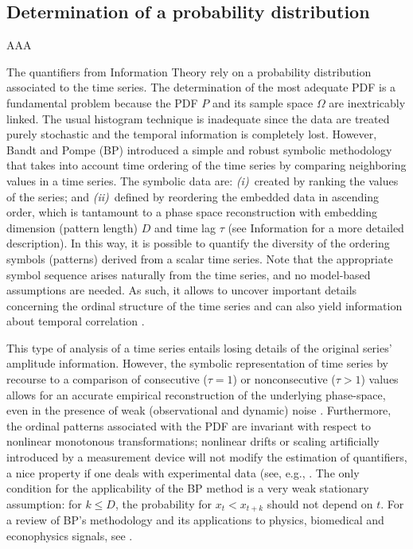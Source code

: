 \subsection{Determination of a probability distribution}

AAA

The quantifiers from Information Theory rely on a probability distribution associated to the time series. 
The determination of the most adequate PDF is a fundamental problem because the PDF $P$ and its sample space 
$\Omega$ are inextricably linked. The usual histogram technique is inadequate since the data are treated purely stochastic and the temporal information is completely lost. 
However, Bandt and Pompe (BP)\cite{Bandt2002} introduced a simple and robust symbolic methodology that takes into account time ordering of the time series by comparing neighboring values in a time series.
The symbolic data are:
{\it (i)\/}~created by ranking the values of the series; and
{\it (ii)\/}~defined by reordering the embedded data in ascending order, which is tantamount to a phase space 
reconstruction with embedding dimension (pattern length) $D$ and time lag $\tau$ (see Information for a more detailed description). 
In this way, it is possible to quantify the diversity of the ordering symbols (patterns) derived from a scalar 
time series.
Note that the appropriate symbol sequence arises naturally from the time series, and no model-based assumptions 
are needed.
As such, it allows to uncover important details concerning the ordinal structure of the time series
\cite{Rosso2007} and can also yield information about temporal correlation \cite{Rosso2009}.

This type of analysis of a time series entails losing details of the original series' amplitude information. However, the symbolic representation of time series by recourse to a comparison of consecutive ($\tau = 1$) or nonconsecutive ($\tau > 1$) values allows for an accurate empirical reconstruction of the underlying phase-space, even in the presence of weak (observational and dynamic) noise \cite{Bandt2002}. Furthermore, the ordinal patterns associated with the PDF are invariant with respect to nonlinear monotonous transformations; nonlinear drifts or scaling artificially introduced by a measurement device will not modify the estimation of quantifiers, a nice property if one deals with experimental data (see, e.g., \cite{Saco2010}. 
The only condition for the applicability of the BP method is a very weak stationary assumption: for 
$k \leq D$, the probability for $x_t < x_{t+k}$ should not depend on $t$.
For a review of BP's methodology and its applications to physics, biomedical and econophysics signals, see \cite{Zanin2012}. 

